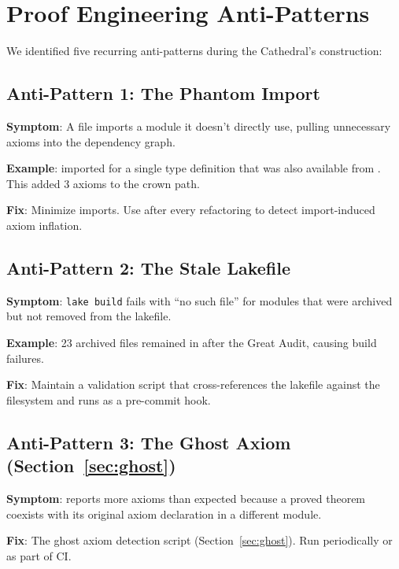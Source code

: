 \documentclass[11pt,a4paper]{article}
\begin{document}
\section{Proof Engineering Anti-Patterns}
\label{sec:antipatterns}

We identified five recurring anti-patterns during the Cathedral's
construction:

\subsection{Anti-Pattern 1: The Phantom Import}

\textbf{Symptom}: A file imports a module it doesn't directly use,
pulling unnecessary axioms into the dependency graph.

\textbf{Example}:  imported
 for a single type definition
that was also available from . This added 3 axioms
to the crown path.

\textbf{Fix}: Minimize imports. Use  after
every refactoring to detect import-induced axiom inflation.

\subsection{Anti-Pattern 2: The Stale Lakefile}

\textbf{Symptom}: \texttt{lake build} fails with ``no such file''
for modules that were archived but not removed from the lakefile.

\textbf{Example}: 23 archived files remained in 
after the Great Audit, causing build failures.

\textbf{Fix}: Maintain a validation script that cross-references
the lakefile against the filesystem and runs as a pre-commit hook.

\subsection{Anti-Pattern 3: The Ghost Axiom (Section~\ref{sec:ghost})}

\textbf{Symptom}:  reports more axioms than
expected because a proved theorem coexists with its original axiom
declaration in a different module.

\textbf{Fix}: The ghost axiom detection script (Section~\ref{sec:ghost}).
Run periodically or as part of CI.
\end{document}
